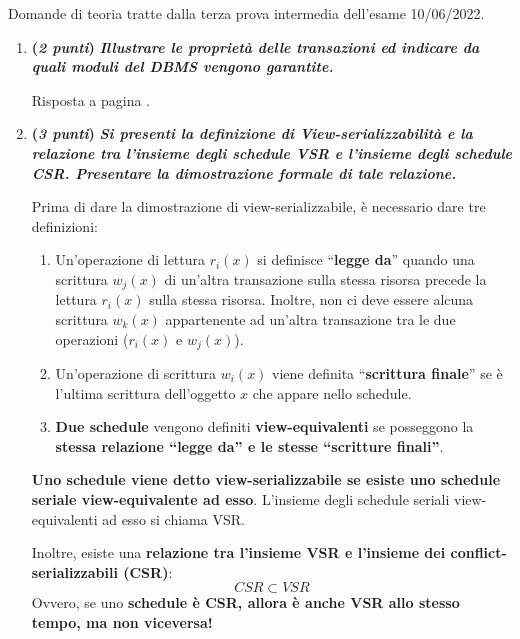 \documentclass[a4paper]{article}
\newcommand{\dquotes}[1]{``#1''}
\begin{document}
	Domande di teoria tratte dalla terza prova intermedia dell'esame 10/06/2022.
	\begin{enumerate}
		\item \textbf{(\emph{2 punti})} \textcolor{Green4}{\textbf{\emph{Illustrare le proprietà delle transazioni ed indicare da quali moduli del DBMS vengono garantite.}}}
		
		Risposta a pagina \pageref{dom: proprietà delle transazioni}.		
		
		\item \textbf{(\emph{3 punti})} \textcolor{Green4}{\textbf{\emph{Si presenti la definizione di View-serializzabilità e la relazione tra l'insieme degli schedule VSR e l'insieme degli schedule CSR. Presentare la dimostrazione formale di tale relazione.}}}\label{dom: view-serializzabilità, relazione VSR e CSR + dimostrazione}
		
		Prima di dare la dimostrazione di view-serializzabile, è necessario dare tre definizioni:
		\begin{enumerate}
			\item Un'operazione di lettura $r_{i}\left(x\right)$ si definisce \dquotes{\textbf{legge da}} quando una scrittura $w_{j}\left(x\right)$ di un'altra transazione sulla stessa risorsa precede la lettura $r_{i}\left(x\right)$ sulla stessa risorsa. Inoltre, non ci deve essere alcuna scrittura $w_{k}\left(x\right)$ appartenente ad un'altra transazione tra le due operazioni ($r_{i}\left(x\right)$ e $w_{j}\left(x\right)$).
			
			\item Un'operazione di scrittura $w_{i}\left(x\right)$ viene definita \dquotes{\textbf{scrittura finale}} se è l'ultima scrittura dell'oggetto $x$ che appare nello schedule.
			
			\item \textbf{Due schedule} vengono definiti \textbf{view-equivalenti} se posseggono la \textbf{stessa relazione \dquotes{legge da} e le stesse \dquotes{scritture finali}}.
		\end{enumerate}
		\textbf{Uno schedule viene detto view-serializzabile se esiste uno schedule seriale view-equivalente ad esso}. L'insieme degli schedule seriali view-equivalenti ad esso si chiama VSR.
		
		Inoltre, esiste una \textbf{relazione tra l'insieme VSR e l'insieme dei conflict-serializzabili (CSR)}:
		\begin{equation*}
			CSR \subset VSR
		\end{equation*}
		Ovvero, se uno \textbf{schedule è CSR, allora è anche VSR allo stesso tempo, ma non viceversa!}\newpage
		

\end{enumerate}
\end{document}
